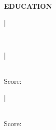 


\vspace{\spaceBeforeSection}
\textbf{EDUCATION} \hrulefill
\vspace{\spaceAfterSection}

\textbf{\PhDUniversity} | \PhDTitle \hfill \PhDDate

\begin{small}
\textit{\PhDThesisShorter} \\
\PhDNotes
\end{small}

\medskip

\textbf{\MScUniversity} | \MScTitle \hfill \MScDate

\begin{small}
\textit{\MScThesis} \\
\MScNotes Score: \MScScore %
\end{small}

\medskip

\textbf{\BScUniversity} | \BScTitle \hfill \BScDate

\begin{small}
\textit{\BScThesis} \\
\BScNotes Score: \BScScore %
\end{small}
